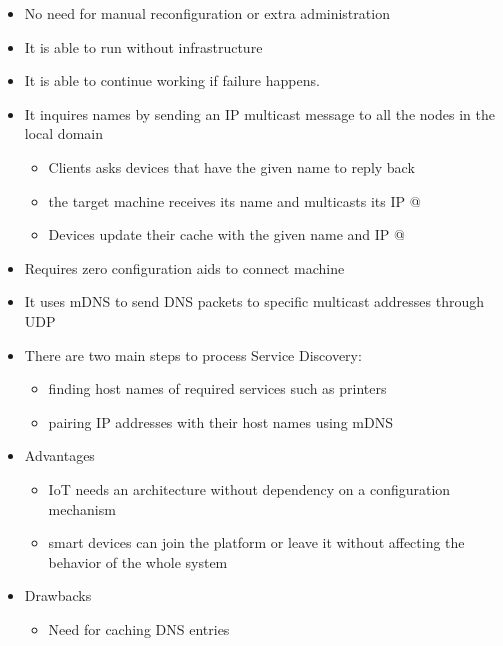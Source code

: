 \begin{itemize}
	\item No need for manual reconfiguration or extra administration
	\item It is able to run without infrastructure
	\item It is able to continue working if failure happens.
		\item It inquires names by sending an IP multicast message to all the nodes in the local domain
		\begin{itemize}
			\item Clients asks devices that have the given name to reply back
			\item the target machine receives its name and multicasts its IP @
			\item Devices update their cache with the given name and IP @
		\end{itemize}
	\end{itemize}

\begin{itemize}
	\item Requires zero configuration aids to connect machine
	\item It uses mDNS to send DNS packets to specific multicast addresses through UDP
	\item There are two main steps to process Service Discovery:
		\begin{itemize}
			\item finding host names of required services such as printers
			\item pairing IP addresses with their host names using mDNS
		\end{itemize}
	\item Advantages
		\begin{itemize}
			\item IoT needs an architecture without dependency on a configuration mechanism
			\item smart devices can join the platform or leave it without affecting the behavior of the whole system
		\end{itemize}
	\item Drawbacks
		\begin{itemize}
			\item Need for caching DNS entries
		\end{itemize}
	\end{itemize}


